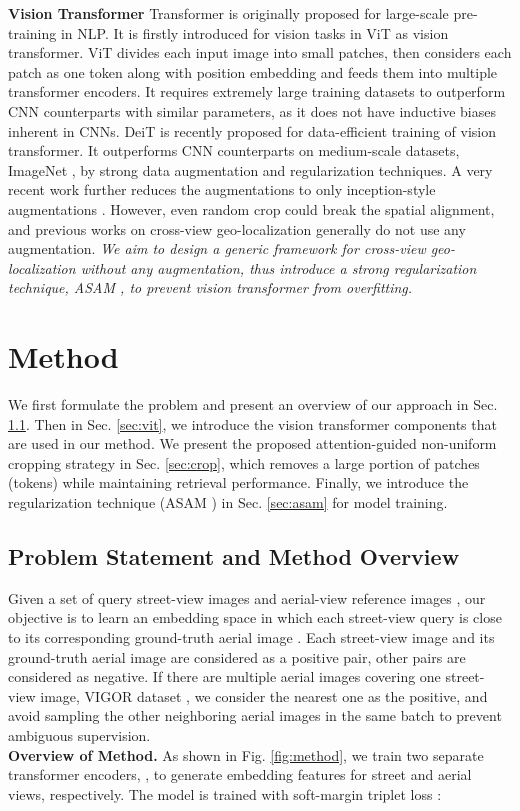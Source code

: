 \documentclass[10pt,twocolumn,letterpaper]{article}
\begin{document}
\noindent\textbf{Vision Transformer} Transformer \cite{transformer} is originally proposed for large-scale pre-training in NLP. 
It is firstly introduced for vision tasks in ViT \cite{vit} as vision transformer. ViT divides each input image into  small patches, then considers each patch as one token along with position embedding and feeds them into multiple transformer encoders. It requires extremely large training datasets to outperform CNN counterparts with similar parameters, as it does not have inductive biases inherent in CNNs. DeiT \cite{deit} is recently proposed for data-efficient training of vision transformer. It outperforms CNN counterparts on medium-scale datasets, \ie ImageNet \cite{deng2009imagenet}, by strong data augmentation and regularization techniques. A very recent work \cite{gong} further reduces the augmentations to only inception-style augmentations \cite{szegedy2016rethinking}. However, even random crop could break the spatial alignment, and previous works on cross-view geo-localization generally do not use any augmentation. \emph{We aim to design a generic framework for cross-view geo-localization without any augmentation, thus introduce a strong regularization technique, \ie ASAM \cite{ASAM}, to prevent vision transformer from overfitting.}


\section{Method}
We first formulate the problem and present an overview of our approach in Sec. \ref{sec:problem}. Then in Sec. \ref{sec:vit}, we introduce the vision transformer components that are used in our method. We present the proposed attention-guided non-uniform cropping strategy in Sec. \ref{sec:crop}, which removes a large portion of patches (tokens) while maintaining retrieval performance. 
Finally, we introduce the regularization technique (ASAM \cite{ASAM}) in Sec. \ref{sec:asam} for model training. 

\subsection{Problem Statement and Method Overview}
\label{sec:problem}
Given a set of query street-view images  and aerial-view reference images , our objective is to learn an embedding space in which each street-view query  is close to its corresponding ground-truth aerial image . Each street-view image and its ground-truth aerial image are considered as a positive pair, other pairs are considered as negative. If there are multiple aerial images covering one street-view image, \eg VIGOR dataset \cite{zhu2021vigor}, we consider the nearest one as the positive, and avoid sampling the other neighboring aerial images in the same batch to prevent ambiguous supervision. \\
\noindent \textbf{Overview of Method.} As shown in Fig. \ref{fig:method}, we train two separate transformer encoders, \ie , to generate embedding features for street and aerial views, respectively. The model is trained with soft-margin triplet loss \cite{CVM}:
\end{document}
